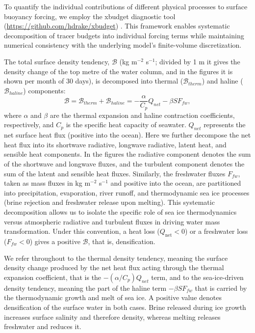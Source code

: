 \documentclass[pdflatex,sn-nature]{sn-jnl}
\begin{document}
To quantify the individual contributions of different physical processes to surface buoyancy forcing, we employ the xbudget diagnostic tool (\url{https://github.com/hdrake/xbudget}) \cite{drake2025water}. This framework enables systematic decomposition of tracer budgets into individual forcing terms while maintaining numerical consistency with the underlying model's finite-volume discretization.

The total surface density tendency, $\mathcal{B}$ (kg m$^{-2}$ s$^{-1}$; divided by 1 m it gives the density change of the top metre of the water column, and in the figures it is shown per month of 30 days), is decomposed into thermal ($\mathcal{B}_{therm}$) and haline ($\mathcal{B}_{haline}$) components:
\begin{equation}
\mathcal{B} = \mathcal{B}_{therm} + \mathcal{B}_{haline} = -\frac{\alpha}{C_p} Q_{net} - \beta S F_{fw},
\end{equation}
where $\alpha$ and $\beta$ are the thermal expansion and haline contraction coefficients, respectively, and $C_p$ is the specific heat capacity of seawater. $Q_{net}$ represents the net surface heat flux (positive into the ocean). Here we further decompose the net heat flux into its shortwave radiative, longwave radiative, latent heat, and sensible heat components. In the figures the radiative component denotes the sum of the shortwave and longwave fluxes, and the turbulent component denotes the sum of the latent and sensible heat fluxes. Similarly, the freshwater fluxes $F_{fw}$, taken as mass fluxes in kg m$^{-2}$ s$^{-1}$ and positive into the ocean, are partitioned into precipitation, evaporation, river runoff, and thermodynamic sea ice processes (brine rejection and freshwater release upon melting). This systematic decomposition allows us to isolate the specific role of sea ice thermodynamics versus atmospheric radiative and turbulent fluxes in driving water mass transformation. Under this convention, a heat loss ($Q_{\text{net}} < 0$) or a freshwater loss ($F_{fw} < 0$) gives a positive $\mathcal{B}$, that is, densification.

We refer throughout to the thermal density tendency, meaning the surface density change produced by the net heat flux acting through the thermal expansion coefficient, that is the $-\left(\alpha/C_p\right)Q_{net}$ term, and to the sea-ice-driven density tendency, meaning the part of the haline term $-\beta S F_{fw}$ that is carried by the thermodynamic growth and melt of sea ice. A positive value denotes densification of the surface water in both cases. Brine released during ice growth increases surface salinity and therefore density, whereas melting releases freshwater and reduces it.
\end{document}
